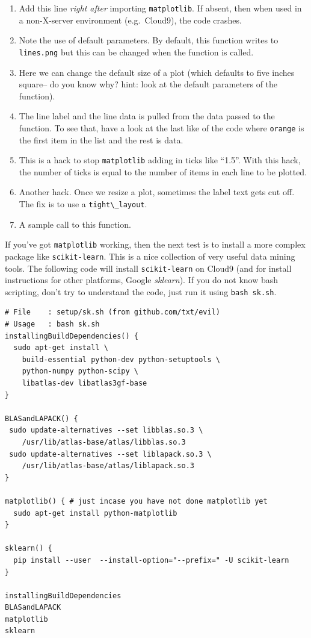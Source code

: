\begin{enumerate}
\def\labelenumi{\arabic{enumi}.}
\itemsep1pt\parskip0pt
\item
  Add this line \emph{right after} importing \texttt{matplotlib}. If
  absent, then when used in a non-X-server environment (e.g.~Cloud9),
  the code crashes.
\item
  Note the use of default parameters. By default, this function writes
  to \texttt{lines.png} but this can be changed when the function is
  called.
\item
  Here we can change the default size of a plot (which defaults to five
  inches square-- do you know why? hint: look at the default parameters
  of the function).
\item
  The line label and the line data is pulled from the data passed to the
  function. To see that, have a look at the last like of the code where
  \texttt{orange} is the first item in the list and the rest is data.
\item
  This is a hack to stop \texttt{matplotlib} adding in ticks like
  ``1.5''. With this hack, the number of ticks is equal to the number of
  items in each line to be plotted.
\item
  Another hack. Once we resize a plot, sometimes the label text gets cut
  off. The fix is to use a \texttt{tight\textbackslash{}\_layout}.
\item
  A sample call to this function.
\end{enumerate}

If you've got \texttt{matplotlib} working, then the next test is to
install a more complex package like \texttt{scikit-learn}. This is a
nice collection of very useful data mining tools. The following code
will install \texttt{scikit-learn} on Cloud9 (and for install
instructions for other platforms, Google \emph{sklearn}). If you do not
know bash scripting, don't try to understand the code, just run it using
\texttt{bash\ sk.sh}.

\begin{lstlisting}
# File    : setup/sk.sh (from github.com/txt/evil)
# Usage   : bash sk.sh
installingBuildDependencies() {
  sudo apt-get install \
    build-essential python-dev python-setuptools \
    python-numpy python-scipy \
    libatlas-dev libatlas3gf-base
}

BLASandLAPACK() { 
 sudo update-alternatives --set libblas.so.3 \
    /usr/lib/atlas-base/atlas/libblas.so.3
 sudo update-alternatives --set liblapack.so.3 \
    /usr/lib/atlas-base/atlas/liblapack.so.3
}

matplotlib() { # just incase you have not done matplotlib yet
  sudo apt-get install python-matplotlib
}

sklearn() {
  pip install --user  --install-option="--prefix=" -U scikit-learn
}

installingBuildDependencies
BLASandLAPACK
matplotlib
sklearn
\end{lstlisting}

